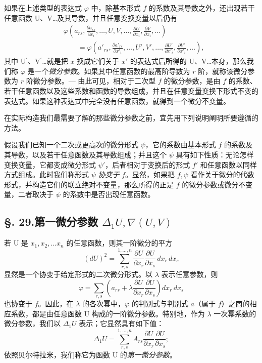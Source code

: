 如果在上述类型的表达式 \(\varphi\) 中，除基本形式 \(f\) 的系数及其导数之外，还出现若干任意函数 U、V\ldots 及其导数，并且任意变换变量以后仍有
\[
\begin{aligned}
&\varphi\left(a_{rs},\frac{\partial a_{rs}}{\partial x_i},\ldots,U,V,\ldots,\frac{\partial U}{\partial x_i},\frac{\partial V}{\partial x_i},\ldots\right)\\
&\qquad =\varphi\left(a'_{rs},\frac{\partial a'_{rs}}{\partial x'_i},\ldots,U',V',\ldots,\frac{\partial U'}{\partial x'_i},\frac{\partial V'}{\partial x'_i},\ldots\right),
\end{aligned}
\]
其中 U\(^{\prime}\)、V\(^{\prime}\)\ldots 就是把 \(x\) 换成它们关于 \(x'\) 的表达式后所得的 U、V\ldots 本身，那么我们称 \(\varphi\) 是一个\emph{微分参数}。如果其中任意函数的最高阶导数为 \(r\) 阶，就称该微分参数为 \(r\) 阶微分参数。--- 由此可见，相对于二次型 \(f\) 的微分参数，是由 \(f\) 的系数、若干任意函数以及这些系数和函数的导数组成，并且在任意变量变换下形式不变的表达式。如果这种表达式中完全没有任意函数，就得到一个微分不变量。

在实际构造我们最需要了解的那些微分参数之前，宜先用下列说明阐明所要遵循的方法。

假设我们已知一个二次或更高次的微分形式 \(\psi\)，它的系数由基本形式 \(f\) 的系数及其导数，以及若干任意函数及其导数组成；并且这个 \(\psi\) 具有如下性质：无论怎样变换变量，它都变成微分形式 \(\psi'\)，后者相对于变换后的形式 \(f'\) 和任意函数以同样方式组成。此时我们称形式 \(\psi\) \emph{协变于} \(f\)。显然，如果把 \(f,\psi\) 看作关于微分的代数形式，并构造它们的联立绝对不变量，那么所得的正是 \(f\) 的微分参数或微分不变量，二者取决于 \(\psi\) 的系数中是否出现任意函数。

\subsection*{\S. 29.\quad 第一微分参数 \(\Delta_1 U,\nabla(U,V)\)}
若 U 是 \(x_1,x_2,\ldots x_n\) 的任意函数，则其一阶微分的平方
\[
(dU)^2=\sum_{r,s}^{1,\ldots,n}\frac{\partial U}{\partial x_r}\frac{\partial U}{\partial x_s}\,dx_r\,dx_s
\]
显然是一个协变于给定形式的二次微分形式。以 \(\lambda\) 表示任意参数，则
\[
\varphi=\sum_{r,s}\left(a_{rs}+\lambda\frac{\partial U}{\partial x_r}\frac{\partial U}{\partial x_s}\right)dx_r\,dx_s
\]
也协变于 \(f\)。因此，在 \(\lambda\) 的各次幂中，\(\varphi\) 的判别式与判别式 \(a\)（属于 \(f\)）之商的相应系数，都是由任意函数 U 构成的一阶微分参数。特别地，作为 \(\lambda\) 一次幂系数的微分参数，我们以 \(\Delta_1 U\) 表示；它显然具有如下值：
\begin{equation}\tag{15}
\Delta_1 U=\sum_{r,s}^{1,\ldots,n}A_{rs}\frac{\partial U}{\partial x_r}\frac{\partial U}{\partial x_s};
\end{equation}
依照贝尔特拉米，我们称它为函数 U 的\emph{第一微分参数}。


